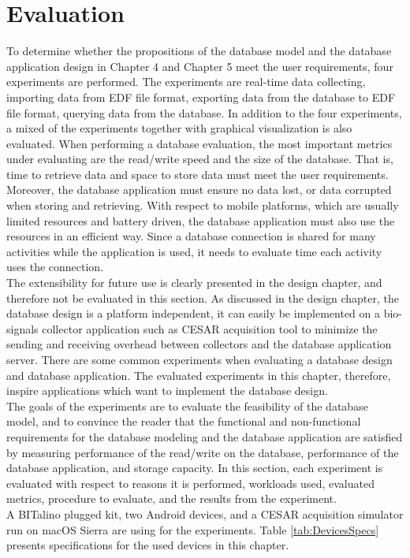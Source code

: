 
\chapter{Evaluation}%

\label{Chapter6} %
To determine whether the propositions of the database model and the database application design in Chapter 4 and Chapter 5 meet the user requirements, four experiments are performed. The experiments are real-time data collecting, importing data from EDF file format, exporting data from the database to EDF file format, querying data from the database. In addition to the four experiments, a mixed of the experiments together with graphical visualization is also evaluated. When performing a database evaluation, the most important metrics under evaluating are the read/write speed and the size of the database. That is, time to retrieve data and space to store data must meet the user requirements. Moreover, the database application must ensure no data lost, or data corrupted when storing and retrieving. With respect to mobile platforms, which are usually limited resources and battery driven, the database application must also use the resources in an efficient way. Since a database connection is shared for many activities while the application is used, it needs to evaluate time each activity uses the connection.\\
The extensibility for future use is clearly presented in the design chapter, and therefore not be evaluated in this section. As discussed in the design chapter, the database design is a platform independent, it can easily be implemented on a bio-signals collector application such as CESAR acquisition tool to minimize the sending and receiving overhead between collectors and the database application server. There are some common experiments when evaluating a database design and database application. The evaluated experiments in this chapter, therefore, inspire applications which want to implement the database design.\\
The goals of the experiments are to evaluate the feasibility of the database model, and to convince the reader that the functional and non-functional requirements for the database modeling and the database application are satisfied by measuring performance of the read/write on the database, performance of the database application, and storage capacity. In this section, each experiment is evaluated with respect to reasons it is performed, workloads used, evaluated metrics, procedure to evaluate, and the results from the experiment.\\
A BITalino plugged kit, two Android devices, and a CESAR acquisition simulator run on macOS Sierra are using for the experiments. Table \ref{tab:DevicesSpecs} presents specifications for the used devices in this chapter.
